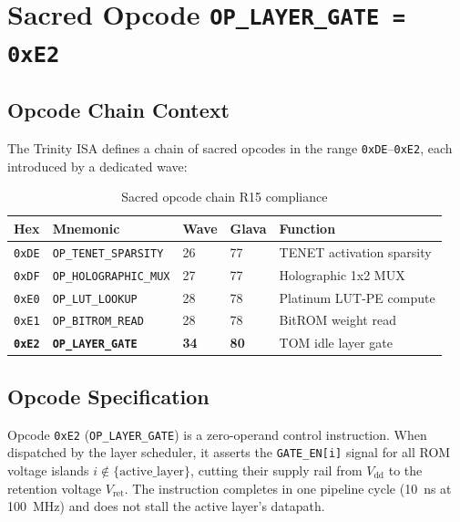 \section{Sacred Opcode \texttt{OP\_LAYER\_GATE = 0xE2}}
\label{sec:opcode}

\subsection{Opcode Chain Context}

The Trinity ISA defines a chain of sacred opcodes in the range
\texttt{0xDE}--\texttt{0xE2}, each introduced by a dedicated wave:

\begin{table}[ht]
\centering
\caption{Sacred opcode chain R15 compliance}
\label{tab:opcode_chain}
\begin{tabular}{lllll}
\hline
Hex & Mnemonic & Wave & Glava & Function \\
\hline
\texttt{0xDE} & \texttt{OP\_TENET\_SPARSITY}   & 26 & 77 & TENET activation sparsity \\
\texttt{0xDF} & \texttt{OP\_HOLOGRAPHIC\_MUX}  & 27 & 77 & Holographic 1x2 MUX \\
\texttt{0xE0} & \texttt{OP\_LUT\_LOOKUP}        & 28 & 78 & Platinum LUT-PE compute \\
\texttt{0xE1} & \texttt{OP\_BITROM\_READ}        & 28 & 78 & BitROM weight read \\
\texttt{\textbf{0xE2}} & \textbf{\texttt{OP\_LAYER\_GATE}} & \textbf{34} & \textbf{80} & TOM idle layer gate \\
\hline
\end{tabular}
\end{table}

\subsection{Opcode Specification}

\begin{definition}
\label{def:op_layer_gate}
Opcode \texttt{0xE2} (\texttt{OP\_LAYER\_GATE}) is a zero-operand
control instruction.  When dispatched by the layer scheduler, it asserts
the \texttt{GATE\_EN[i]} signal for all ROM voltage islands \(i \notin
\{\mathrm{active\_layer}\}\), cutting their supply rail from
\(V_{\mathrm{dd}}\) to the retention voltage \(V_{\mathrm{ret}}\).  The
instruction completes in one pipeline cycle (10~ns at 100~MHz) and does
not stall the active layer's datapath.
\end{definition}


